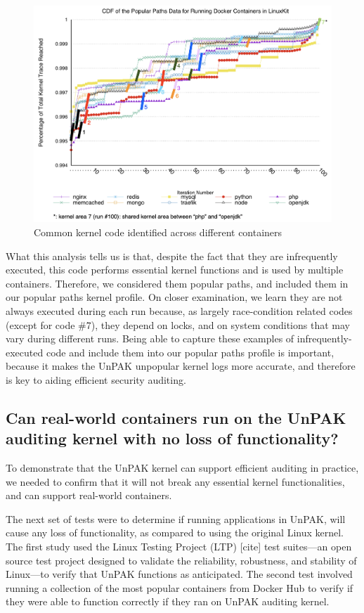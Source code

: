 \begin{figure}
\centering
\includegraphics[width=1.5\columnwidth]{diagram/cdf-marked.png}
\caption{\small Common kernel code identified across different containers}
\label{fig:cdf-marked}
\end{figure}

What this analysis tells us is that, despite the fact that they are infrequently executed, this  code performs essential kernel functions and is used by multiple containers. 
Therefore, we considered them popular paths, and included them in our popular paths kernel profile. On closer examination, we learn they are not always executed during each run  because, 
as largely race-condition related codes (except for code \#7), they depend on locks, and on system conditions that may vary during different runs. 
Being able to capture these examples of infrequently-executed code and include them into our popular paths profile is important, because it makes the UnPAK unpopular kernel logs more accurate, 
and therefore is key to aiding efficient security auditing. 


\subsection{Can real-world containers run on the UnPAK auditing kernel with no loss of functionality?}
\label{sec.evaluation.3} 
To demonstrate that the UnPAK kernel can support efficient auditing in practice, we needed to confirm that it will not break any essential kernel functionalities, and can support real-world containers.

The next set of tests were to determine if  running applications in UnPAK, will cause any loss of functionality, as compared to using the original Linux kernel. 
The first study used the Linux Testing Project (LTP) [cite] test suites—an open source test project designed to validate the reliability, robustness, and stability of Linux—to verify that 
UnPAK functions as anticipated. The second test involved running a collection of the most popular containers from Docker Hub to verify if they were able to function correctly if they ran on UnPAK auditing kernel.

